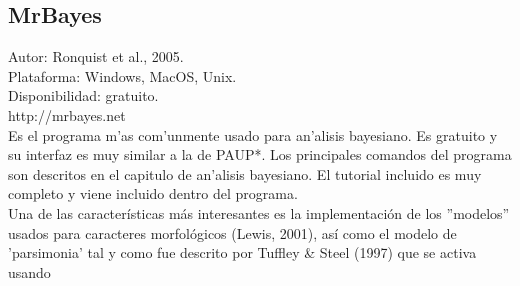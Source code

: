 \subsection{MrBayes}
\noindent
Autor: Ronquist et al., 2005.\\
Plataforma: Windows, MacOS, Unix.\\
Disponibilidad: gratuito.\\
http://mrbayes.net
\\
Es el programa m'as com'unmente usado para an'alisis bayesiano. Es gratuito y su interfaz es muy similar a la de PAUP*. Los principales comandos del programa son descritos en el capitulo de an'alisis bayesiano. El tutorial incluido es muy completo y viene incluido dentro del programa.\\
Una de las caracter\'isticas m\'as interesantes es la implementaci\'on de los ''modelos'' usados para caracteres morfol\'ogicos (Lewis, 2001), as\'i como el modelo de 'parsimonia' tal y como fue descrito por Tuffley \& Steel (1997) que se activa usando 

\\




